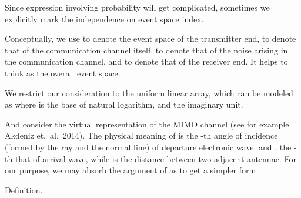 \startchapter [title={Problem Setting}]

\startsection [title={Channel Model}]

Since expression involving probability will get complicated, sometimes we explicitly mark the independence on event space index.

Conceptually, we use  to denote the event space of the transmitter end,  to denote that of the communication channel itself,  to denote that of the noise arising in the communication channel, and  to denote that of the receiver end.
It helps to think  as the overall event space.

We restrict our consideration to the uniform linear array, which can be modeled as
where  is the base of natural logarithm, and  the imaginary unit.

And consider the virtual representation of the MIMO channel (see for example Akdeniz et.\ al.\ 2014).
The physical meaning of  is the -th angle of incidence (formed by the ray and the normal line) of departure electronic wave, and , the -th that of arrival wave, while  is the distance between two adjacent antennae.
For our purpose, we may absorb the argument of  as
to get a simpler form

\Result
{Definition.}
{
}

\stopsection



\startsection [title={System Model}]

